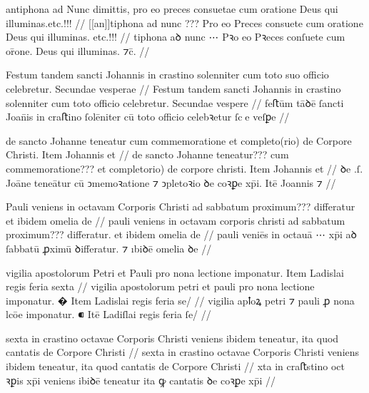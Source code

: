 \ex \bg
\gla
{}
antiphona ad Nunc dimittis, pro eo preces consuetae cum
oratione Deus qui illuminas.{etc.!!!}
//
\glRekonstrukcja
{}
[[an]]tiphona ad nunc {???} Pro eo Preces consuete cum
oratione Deus qui illuminas. {etc.!!!}
//
\glU
{}
tiphona aꝺ nunc ⋯ Pꝛo eo Pꝛeces conſuete cum or̄one. Deus qui illuminas. {⁊c̄}.
//
\endgl
\xe




\ex \bg
\gla
{}
Festum tandem sancti Johannis in crastino solenniter cum toto
suo officio celebretur. Secundae vesperae
//
\glRekonstrukcja
{}
Festum tandem sancti Johannis in crastino solenniter cum toto
{} officio celebretur. Secundae vespere
//
\glU
{}
feﬅūm tāꝺē ſancti Joan̄is in craﬅino ſolēniter cū toto {} oﬀicio celebꝛetur ſce veſꝑe
//
\endgl
\xe



\ex \bg
\gla
{}
de sancto Johanne teneatur
cum commemoratione et completo(rio) de Corpore Christi.
Item Johannis et
//
\glRekonstrukcja
{}
de sancto Johanne teneatur???
cum commemoratione??? et completorio) de corpore christi.
Item Johannis et
//
\glU
{}
ꝺe .ſ. Joāne teneātur cū ↄmemoꝛatione ⁊ ↄpletoꝛio ꝺe coꝛꝑe xp̄i. Itē Joannis ⁊
//
\endgl
\xe



\ex \bg
\gla
{}
Pauli veniens in octavam Corporis Christi ad
sabbatum proximum??? differatur et ibidem omelia de
//
\glRekonstrukcja
{}
pauli veniens in octavam corporis christi ad
sabbatum proximum??? differatur. et ibidem omelia de
//
\glU
{}
pauli veniēs in octauā ⋯ xp̄i aꝺ ſabbatū ꝓximū ꝺiﬀeratur. ⁊ ıbiꝺē omelia ꝺe
//
\endgl
\xe



\ex \bg
\gla
{}
vigilia apostolorum
Petri et Pauli pro nona lectione imponatur.
{} Item Ladislai regis feria sexta
//
\glRekonstrukcja
{}
vigilia apostolorum
petri et pauli pro nona lectione imponatur.
� Item Ladislai regis feria se/
//
\glU
{}
vigilia apꝉoꝝ petri ⁊ pauli ꝓ nona lcōe imponatur. ⁌ Itē Ladiſlai regis feria ſe/
//
\endgl
\xe



\ex \bg
\gla
{}
sexta in crastino octavae Corporis Christi
veniens ibidem teneatur, ita quod cantatis de Corpore Christi
//
\glRekonstrukcja
{}
sexta in crastino octavae Corporis Christi
veniens ibidem teneatur, ita quod cantatis de Corpore Christi
//
\glU
{}
xta in craﬅstino oct ꝛꝑis xp̄i veniens ibiꝺē teneatur ita ꝙ cantatis ꝺe coꝛꝑe xp̄i
//
\endgl
\xe




